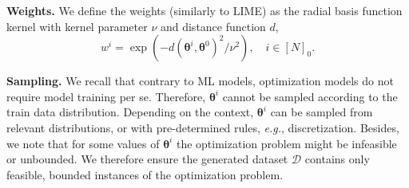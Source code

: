 \documentclass{article}
\theoremstyle{plain}
\theoremstyle{definition}
\theoremstyle{remark}
\begin{document}
\textbf{Weights.} We define the weights (similarly to LIME) as the radial basis function kernel with kernel parameter $\nu$ and distance function $d$,
\begin{equation}\label{eqn:rbf_weight}
w^i = \exp(-d(\bm{\theta}^i,\bm{\theta}^0)^2/\nu^2),\quad i\in[N]_0.
\end{equation}

\textbf{Sampling.} We recall that contrary to ML models, optimization models do not require model training per se. Therefore, $\bm{\theta}^i$ cannot be sampled according to the train data distribution. Depending on the context, $\bm{\theta}^i$ can be sampled from relevant distributions, or with pre-determined rules, \textit{e.g.}, discretization. Besides, we note that for some values of $\bm{\theta}^i$ the optimization problem might be infeasible or unbounded. We therefore ensure the generated dataset $\mathcal{D}$ contains only feasible, bounded instances of the optimization problem.
\end{document}
